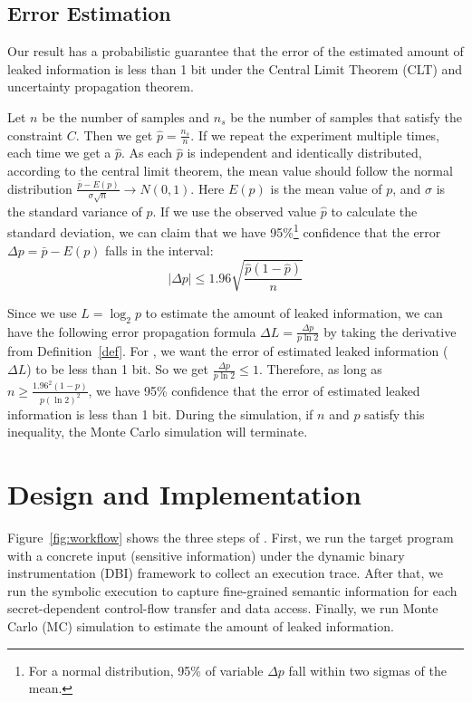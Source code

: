 \subsection{Error Estimation}
\label{sssec:errest}
Our result has a probabilistic guarantee that the error of the estimated amount of leaked
information is less than 1 bit under the Central Limit Theorem (CLT) and uncertainty
propagation theorem.

Let $n$ be the number of samples and $n_s$ be the number of samples that satisfy
the constraint $C$. Then we get $\hat{p} = \frac{n_s}{n}$. If we repeat the
experiment multiple times, each time we get a $\hat{p}$. As each
$\hat{p}$ is independent and identically distributed, according to the central limit
theorem, the mean value should follow the normal distribution
$ \frac{\bar{p}-E(p)}{\sigma\sqrt{n}} \rightarrow N(0,1) $. Here $E(p)$ is the
mean value of $p$, and $\sigma$ is the standard variance of $p$. If we use the
observed value $\hat{p}$ to calculate the standard deviation, we can claim that
we have 95\%\footnote{For a normal distribution, 95\% of variable $\Delta p$ fall within two sigmas of the mean.}
confidence that the error $\Delta p= \bar{p} - E(p)$ falls in the interval:
$$ |\Delta p| \leq 1.96\sqrt{\frac{ \hat{p} (1- \hat{p} )}{n}}$$

Since we use $L = \log_{2}p$ to estimate the amount of leaked information, we
can have the following error propagation formula $\Delta L = \frac{\Delta
        p}{p\ln2}$ by taking the derivative from Definition~\ref{def}. For \tool, we want the error of estimated leaked
information ($\Delta L$) to be less than 1 bit. So we get $\frac{\Delta
        p}{p\ln2} \leq 1$. Therefore, as long as $ n \geq \frac{1.96^2(1-p)}{p(\ln2)^2}$, we have
95\% confidence that the error of estimated leaked information is less than 1 bit.
During the simulation, if $n$ and $p$ satisfy this inequality, the Monte Carlo
simulation will terminate.

\section{Design and Implementation}

Figure~\ref{fig:workflow} shows the three steps of \tool{}.
First, we run the target program with a
concrete input (sensitive information) under the dynamic binary instrumentation
(DBI) framework to collect an execution trace. After that, we run the symbolic
execution to capture fine-grained semantic information for each
secret-dependent control-flow transfer and data access. Finally, we run Monte
Carlo (MC) simulation to estimate the amount of leaked information.

